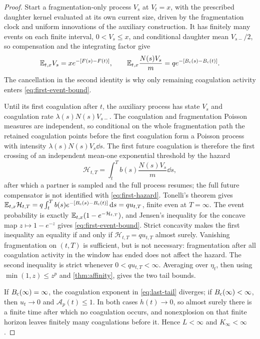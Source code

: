 \begin{proof}
Start a fragmentation-only process $V_s$ at $V_t=x$, with the
prescribed daughter kernel evaluated at its own current size, driven
by the fragmentation clock and uniform innovations of the auxiliary
construction. It has finitely many events on each finite interval,
$0<V_s\leq x$, and conditional daughter mean $V_{s-}/2$, so
compensation and the integrating factor give
\begin{equation}
 \mathbb E_{t,x}V_s=xe^{-[F(s)-F(t)]},\qquad
 \mathbb E_{t,x}\frac{N(s)V_s}{m}=q e^{-[B_{\mathrm c}(s)-B_{\mathrm c}(t)]}.
 \label{eq:fragmentation-first-mean}
\end{equation}
The cancellation in the second identity is why only remaining
coagulation activity enters \eqref{eq:first-event-bound}.

Until its first coagulation after $t$, the auxiliary process has
state $V_s$ and coagulation rate $\lambda(s)N(s)V_{s-}$. The
coagulation and fragmentation Poisson measures are independent, so
conditional on the whole fragmentation path the retained coagulation
points before the first coagulation form a Poisson process with
intensity $\lambda(s)N(s)V_s\dd s$. The first future coagulation is
therefore the first crossing of an independent mean-one exponential
threshold by the hazard
\begin{equation}
 \mathcal H_{t,T}=\int_t^T b(s)\frac{N(s)V_s}{m}\dd s,
 \label{eq:first-hazard}
\end{equation}
after which a partner is sampled and the full process resumes; the
full future compensator is not identified with \eqref{eq:first-hazard}.
Tonelli's theorem gives
$\mathbb E_{t,x}\mathcal H_{t,T}=q\int_t^Tb(s)e^{-[B_{\mathrm c}(s)-B_{\mathrm c}(t)]}\,\mathrm d s
=qu_{t,T}$, finite even at $T=\infty$. The event probability is
exactly $\mathbb E_{t,x}(1-e^{-\mathcal H_{t,T}})$, and Jensen's inequality
for the concave map $z\mapsto1-e^{-z}$ gives
\eqref{eq:first-event-bound}. Strict concavity makes the first inequality
an equality if and only if $\mathcal H_{t,T}=qu_{t,T}$ almost surely.
Vanishing fragmentation on $(t,T)$ is sufficient, but is not necessary:
fragmentation after all coagulation activity in the window has ended
does not affect the hazard. The second inequality is strict whenever
$0<qu_{t,T}<\infty$.
Averaging over $\eta_t$, then using $\min(1,z)\leq z^p$ and
\cref{thm:affinity}, gives the two tail bounds.

If $B_{\mathrm c}(\infty)=\infty$, the coagulation exponent in
\eqref{eq:last-tail} diverges; if $B_{\mathrm c}(\infty)<\infty$, then
$u_t\to0$ and $\mathcal A_p(t)\leq1$. In both cases $h(t)\to0$, so
almost surely there is a finite time after which no coagulation
occurs, and nonexplosion on that finite horizon leaves finitely many
coagulations before it. Hence $L<\infty$ and $K_\infty<\infty$.
\end{proof}

